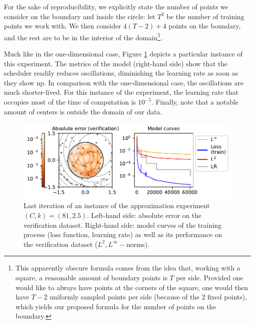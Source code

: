 \documentclass[12pt]{report} %
\begin{document}
For the sake of reproducibility, we explicitly state the number of points we consider on the boundary and inside the circle: let $T^2$ be the number of training points we work with. We then consider $4 (T - 2) + 4$ points on the boundary, and the rest are to be in the interior of the domain\footnote{This apparently obscure formula comes from the idea that, working with a square, a reasonable amount of boundary points is $T$ per side. Provided one would like to always have points at the corners of the square, one would then have $T-2$ uniformly sampled points per side (because of the $2$ fixed points), which yields our proposed formula for the number of points on the boundary.}.

Much like in the one-dimensional case, Figure \ref{fig:parabola-example-training-TR15-C81} depicts a particular instance of this experiment. The metrics of the model (right-hand side) show that the scheduler readily reduces oscillations, diminishing the learning rate as soon as they show up. In comparison with the one-dimensional case, the oscillations are much shorter-lived. For this instance of the experiment, the learning rate that occupies most of the time of computation is $10^{-5}$. Finally, note that a notable amount of centers is outside the domain of our data.

\begin{figure}[h]
  \includegraphics[width=\textwidth]{imagenes/experiments/2d/statistical_2d_full_scheduler_interpolation/parabola/parabola-TR15-C81-Kgaussian_kernel-Sh1.9531-rrrepetishon-E60521.pdf}
  \caption{Last iteration of an instance of the approximation experiment $(C,k)=(81,2.5)$. Left-hand side: absolute error on the verification dataset. Right-hand side: model curves of the training process (loss function, learning rate) as well as its performance on the verification dataset ($L^2, L^\infty-$norms).}
  \label{fig:parabola-example-training-TR15-C81}
\end{figure}
\end{document}
